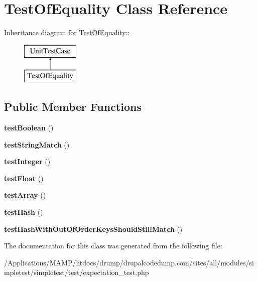 \hypertarget{class_test_of_equality}{
\section{TestOfEquality Class Reference}
\label{class_test_of_equality}
}
Inheritance diagram for TestOfEquality::\begin{figure}[H]
\begin{center}
\leavevmode
\includegraphics[height=2cm]{class_test_of_equality}
\end{center}
\end{figure}
\subsection*{Public Member Functions}
\begin{DoxyCompactItemize}
\item 
\hypertarget{class_test_of_equality_a09d7affb97f04e806378112d9d9fdb76}{
{\bfseries testBoolean} ()}
\label{class_test_of_equality_a09d7affb97f04e806378112d9d9fdb76}

\item 
\hypertarget{class_test_of_equality_a4c9e05a951c13e252ad7ba0a3442e31c}{
{\bfseries testStringMatch} ()}
\label{class_test_of_equality_a4c9e05a951c13e252ad7ba0a3442e31c}

\item 
\hypertarget{class_test_of_equality_a0cf07ce87bdf384c82ef71be194b2ce1}{
{\bfseries testInteger} ()}
\label{class_test_of_equality_a0cf07ce87bdf384c82ef71be194b2ce1}

\item 
\hypertarget{class_test_of_equality_a88abcfe798c897982381ba67b8868e68}{
{\bfseries testFloat} ()}
\label{class_test_of_equality_a88abcfe798c897982381ba67b8868e68}

\item 
\hypertarget{class_test_of_equality_a5e4b1833d0422dd8124db38c7282eceb}{
{\bfseries testArray} ()}
\label{class_test_of_equality_a5e4b1833d0422dd8124db38c7282eceb}

\item 
\hypertarget{class_test_of_equality_aeb0d327e0b2ff56bf1d35996a2ec827d}{
{\bfseries testHash} ()}
\label{class_test_of_equality_aeb0d327e0b2ff56bf1d35996a2ec827d}

\item 
\hypertarget{class_test_of_equality_a02207ae96dffe08f93e06553e67d778a}{
{\bfseries testHashWithOutOfOrderKeysShouldStillMatch} ()}
\label{class_test_of_equality_a02207ae96dffe08f93e06553e67d778a}

\end{DoxyCompactItemize}


The documentation for this class was generated from the following file:\begin{DoxyCompactItemize}
\item 
/Applications/MAMP/htdocs/drump/drupalcodedump.com/sites/all/modules/simpletest/simpletest/test/expectation\_\-test.php\end{DoxyCompactItemize}
